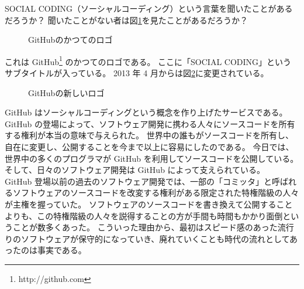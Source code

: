 SOCIAL CODING（ソーシャルコーディング）という言葉を聞いたことがあるだろうか？
聞いたことがない者は図\ref{GitHubのかつてのロゴ}を見たことがあるだろうか？
\begin{figure}[H]\centering{}\caption{GitHubのかつてのロゴ}\label{GitHubのかつてのロゴ}\end{figure}\vspc{-5.00pt}
これは GitHub\footnote{http://github.com} のかつてのロゴである。
ここに「SOCIAL CODING」というサブタイトルが入っている。
2013 年 4 月からは図\ref{GitHubの新しいロゴ}に変更されている。
\begin{figure}[H]\centering{}\caption{GitHubの新しいロゴ}\label{GitHubの新しいロゴ}\end{figure}\vspc{-5.00pt}
GitHub はソーシャルコーディングという概念を作り上げたサービスである。
GitHub の登場によって、ソフトウェア開発に携わる人々にソースコードを所有する権利が本当の意味で与えられた。
世界中の誰もがソースコードを所有し、自在に変更し、公開することを今まで以上に容易にしたのである。
今日では、世界中の多くのプログラマが GitHub を利用してソースコードを公開している。
そして、日々のソフトウェア開発は GitHub によって支えられている。\\

GitHub 登場以前の過去のソフトウェア開発では、一部の「コミッタ」と呼ばれるソフトウェアのソースコードを改変する権利がある限定された特権階級の人々が主権を握っていた。
ソフトウェアのソースコードを書き換えて公開することよりも、この特権階級の人々を説得することの方が手間も時間もかかり面倒ということが数多くあった。
こういった理由から、最初はスピード感のあった流行りのソフトウェアが保守的になっていき、廃れていくことも時代の流れとしてあったのは事実である。\\

